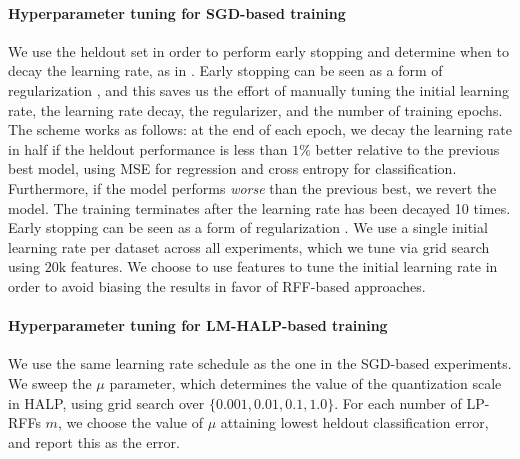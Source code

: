 \paragraph{Hyperparameter tuning for SGD-based training}
We use the heldout set in order to perform early stopping and determine when to decay the learning rate, as in \citep{morgan1990generalization,sainath2013b,sainath2013low}. Early stopping can be seen as a form of regularization \citep{zhang2005boosting,wei2017early}, and this saves us the effort of manually tuning the initial learning rate, the learning rate decay, the regularizer, and the number of training epochs.  The scheme works as follows: at the end of each epoch, we decay the learning rate in half if the heldout performance is less than $1\%$ better relative to the previous best model, using MSE for regression and cross entropy for classification. Furthermore, if the model performs \textit{worse} than the previous best, we revert the model. The training terminates after the learning rate has been decayed 10 times. Early stopping can be seen as a form of regularization \citep{zhang2005boosting,wei2017early}.  We use a single initial learning rate per dataset across all experiments, which we tune via grid search using $20\text{k}$ \Nystrom features. We choose to use \Nystrom features to tune the initial learning rate in order to avoid biasing the results in favor of RFF-based approaches.

\paragraph{Hyperparameter tuning for LM-HALP-based training}
We use the same learning rate schedule as the one in the SGD-based experiments. We sweep the $\mu$ parameter, which determines the value of the quantization scale in HALP, using grid search over $\{0.001, 0.01, 0.1, 1.0\}$. For each number of LP-RFFs $m$, we choose the value of $\mu$ attaining lowest heldout classification error, and report this as the error.

